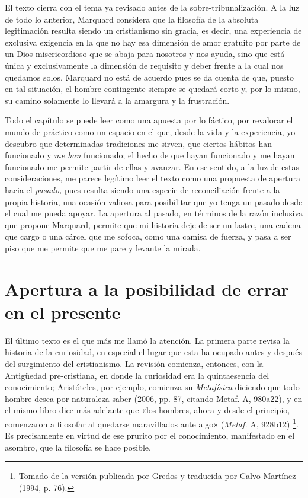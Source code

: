 \begin{refsection}
El texto cierra con el tema ya revisado antes de la sobre-tribunalización. A la luz de todo lo anterior, Marquard considera que la filosofía de la absoluta legitimación resulta siendo un cristianismo sin gracia, es decir, una experiencia de exclusiva exigencia en la que no hay esa dimensión de amor gratuito por parte de un Dios misericordioso que se abaja para nosotros y nos ayuda, sino que está única y exclusivamente la dimensión de requisito y deber frente a la cual nos quedamos solos. Marquard no está de acuerdo pues se da cuenta de que, puesto en tal situación, el hombre contingente siempre se quedará corto y, por lo mismo, su camino solamente lo llevará a la amargura y la frustración.

\separador{}

Todo el capítulo se puede leer como una apuesta por lo fáctico, por revalorar el mundo de práctico como un espacio en el que, desde la vida y la experiencia, yo descubro que determinadas tradiciones me sirven, que ciertos hábitos han funcionado y \emph{me han} funcionado; el hecho de que hayan funcionado y me hayan funcionado me permite partir de ellas y avanzar. En ese sentido, a la luz de estas consideraciones, me parece legítimo leer el texto como una propuesta de apertura hacia el \emph{pasado,} pues resulta siendo una especie de reconciliación frente a la propia historia, una ocasión valiosa para posibilitar que yo tenga un pasado desde el cual me pueda apoyar. La apertura al pasado, en términos de la razón inclusiva que propone Marquard, permite que mi historia deje de ser un lastre, una cadena que cargo o una cárcel que me sofoca, como una camisa de fuerza, y pasa a ser piso que me permite que me pare y levante la mirada.

\section{Apertura a la posibilidad de errar en el presente}

El último texto es el que más me llamó la atención. La primera parte revisa la historia de la curiosidad, en especial el lugar que esta ha ocupado antes y después del surgimiento del cristianismo. La revisión comienza, entonces, con la Antigüedad pre-cristiana, en donde la curiosidad era la quintaesencia del conocimiento; Aristóteles, por ejemplo, comienza su \emph{Metafísica} diciendo que todo hombre desea por naturaleza saber (2006, pp. 87, citando Metaf. A, 980a22), y en el mismo libro dice más adelante que «los hombres, ahora y desde el principio, comenzaron a filosofar al quedarse maravillados ante algo» (\emph{Metaf.} A, 928b12) \footnote{Tomado de la versión publicada por Gredos y traducida por Calvo Martínez (1994, p. 76).}. Es precisamente en virtud de ese prurito por el conocimiento, manifestado en el asombro, que la filosofía se hace posible.


\end{refsection}
